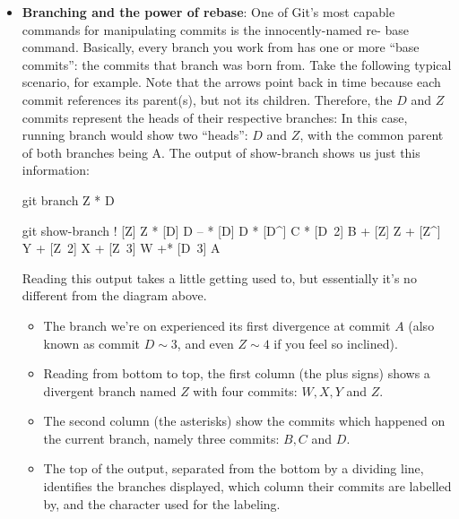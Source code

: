 \documentclass{report}
\begin{document}
    \pagebreak 
    \begin{itemize}
        \item \textbf{Branching and the power of rebase}: One of Git’s most capable commands for manipulating commits is the innocently-named re- base command. Basically, every branch you work from has one or more “base commits”: the commits that branch was born from.
            \bigbreak \noindent 
            Take the following typical scenario, for example. Note that the arrows point back in time because each commit references its parent(s), but not its children. Therefore, the $D$ and $Z$ commits represent the heads of their respective branches:
            \bigbreak \noindent 
            \bigbreak \noindent 
            In this case, running branch would show two “heads”: $D$ and $Z$, with the common parent of both branches being A. The output of show-branch shows us just this information:
            \bigbreak \noindent 
            \begin{bashcode}
                git branch
                Z
                * D
            \end{bashcode}
            \bigbreak \noindent 
            \begin{bashcode}
                git show-branch
                ! [Z] Z
                * [D] D
                --
                * [D] D
                * [D^] C
                * [D~2] B
                + [Z] Z
                + [Z^] Y
                + [Z~2] X
                + [Z~3] W
                +* [D~3] A
            \end{bashcode}
            \bigbreak \noindent 
            Reading this output takes a little getting used to, but essentially it’s no different from the diagram above.
            \begin{itemize}
                \item The branch we’re on experienced its first divergence at commit $A$ (also known as commit $D\sim 3$, and even $Z\sim 4$ if you feel so inclined). 
                \item Reading from bottom to top, the first column (the plus signs) shows a divergent branch named $Z$ with four commits: $W, X, Y$ and $Z$.
                \item The second column (the asterisks) show the commits which happened on the current branch, namely three commits: $B, C$ and $D$.
                \item The top of the output, separated from the bottom by a dividing line, identifies the branches displayed, which column their commits are labelled by, and the character used for the labeling.

\end{itemize}
\end{itemize}
\end{document}
